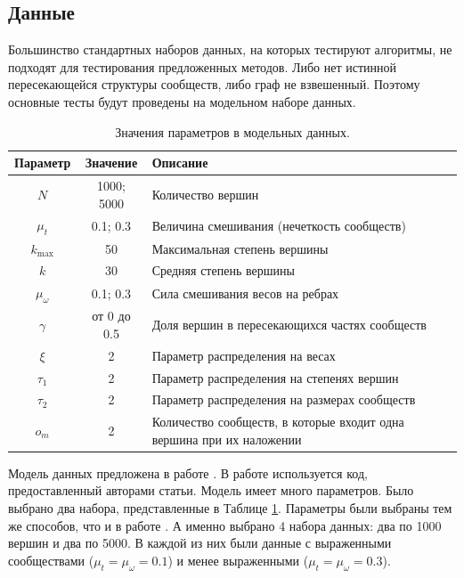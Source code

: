 \documentclass{ITaSconf}
\begin{document}
	\subsection{Данные}
	Большинство стандартных наборов данных, на которых тестируют алгоритмы, не подходят для тестирования предложенных методов.
	Либо нет истинной пересекающейся структуры сообществ, либо граф не взвешенный.
	Поэтому основные тесты будут проведены на модельном наборе данных.
	\begin{center}
		\begin{table}[!th]
			\centering
			\begin{tabular}{ c c l }
				\hline
				\hline
				\textbf{Параметр} & \textbf{Значение} & \textbf{Описание} \\
				\hline
				$N$				& 1000; 5000 	& Количество вершин	\\[2px]
				$\mu_t$			& 0.1; 0.3 		& Величина смешивания (нечеткость сообществ)\\[2px]
				$k_{\max}$		& 50 			& Максимальная степень вершины\\[2px]
				$k$				& 30	 		& Средняя степень вершины\\[2px]
				$\mu_{\omega}$	& 0.1; 0.3 		& Сила смешивания весов на ребрах\\[2px]
				$\gamma$		& от 0 до 0.5 	& Доля вершин в пересекающихся частях сообществ\\[2px]
				$\xi$			& 2 			& Параметр распределения на весах\\[2px]
				$\tau_1$		& 2 			& Параметр распределения на степенях вершин\\[2px]
				$\tau_2$		& 2 			& Параметр распределения на размерах сообществ\\[2px]
				$o_m$			& 2 			& Количество сообществ, в которые входит одна вершина при их наложении \\
				\hline
				\hline
			\end{tabular}
			\centering
			\caption{Значения параметров в модельных данных.}
			\label{table:bench_params}
		\end{table}
	\end{center}
	Модель данных предложена в работе \cite{lancichinetti2009benchmarks}.
	В работе используется код, предоставленный авторами статьи.
	Модель имеет много параметров.
	Было выбрано два набора, представленные в Таблице \ref{table:bench_params}.
	Параметры были выбраны тем же способов, что и в работе \cite{lu2015algorithms}.
	А именно выбрано 4 набора данных: два по 1000 вершин и два по 5000.
	В каждой из них были данные с выраженными сообществами ($\mu_t=\mu_{\omega}=0.1$) и менее выраженными ($\mu_t=\mu_{\omega}=0.3$).
	
\end{document}
